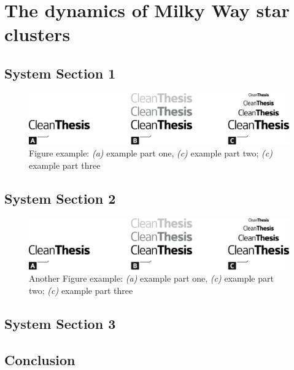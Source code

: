%
\chapter{The dynamics of Milky Way star clusters}
\label{sec:dynamics}


\Blindtext[2][1]

\section{System Section 1}
\label{sec:dynamics:sec1}

\Blindtext[1][2]

\begin{figure}[htb]
	\includegraphics[width=\textwidth]{gfx/Clean-Thesis-Figure}
	\caption{Figure example: \textit{(a)} example part one, \textit{(c)} example part two; \textit{(c)} example part three}
	\label{fig:dynamics:example1}
\end{figure}

\Blindtext[1][2]

\section{System Section 2}
\label{sec:dynamics:sec2}

\Blindtext[1][2]

\begin{figure}[htb]
	\includegraphics[width=\textwidth]{gfx/Clean-Thesis-Figure}
	\caption{Another Figure example: \textit{(a)} example part one, \textit{(c)} example part two; \textit{(c)} example part three}
	\label{fig:dynamics:example2}
\end{figure}

\Blindtext[2][2]

\section{System Section 3}
\label{sec:dynamics:sec3}

\Blindtext[4][2]

\section{Conclusion}
\label{sec:dynamics:conclusion}

\Blindtext[2][1]
